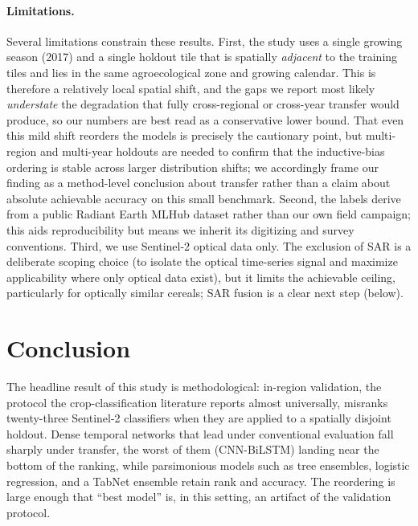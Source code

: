 \documentclass[pdflatex,sn-mathphys]{sn-jnl} %
\begin{document}
\paragraph{Limitations.}

Several limitations constrain these results. First, the study uses a single growing
season (2017) and a single holdout tile that is spatially \emph{adjacent} to the
training tiles and lies in the same agroecological zone and growing calendar. This is
therefore a relatively local spatial shift, and the gaps we report most likely
\emph{understate} the degradation that fully cross-regional or cross-year transfer
would produce, so our numbers are best read as a conservative lower bound. That even
this mild shift reorders the models is precisely the cautionary point, but
multi-region and multi-year holdouts are needed to confirm that the inductive-bias
ordering is stable across larger distribution shifts; we accordingly frame our finding
as a method-level conclusion about transfer rather than a claim about absolute
achievable accuracy on this small benchmark. Second, the labels derive from a public
Radiant Earth MLHub dataset rather than our own field campaign; this aids
reproducibility but means we inherit its digitizing and survey conventions. Third,
we use Sentinel-2 optical data only. The exclusion of SAR is a deliberate scoping
choice (to isolate the optical time-series signal and maximize applicability where
only optical data exist), but it limits the achievable ceiling, particularly for
optically similar cereals; SAR fusion is a clear next step (below).

\section{Conclusion}

The headline result of this study is methodological: in-region validation, the protocol
the crop-classification literature reports almost universally, misranks twenty-three
Sentinel-2 classifiers when they are applied to a spatially disjoint holdout. Dense
temporal networks that lead under conventional evaluation fall sharply under transfer,
the worst of them (CNN-BiLSTM) landing near the bottom of the ranking, while
parsimonious models such as tree ensembles, logistic regression, and a TabNet
ensemble retain rank and accuracy. The reordering is large enough that ``best model''
is, in this setting, an artifact of the validation protocol.
\end{document}
